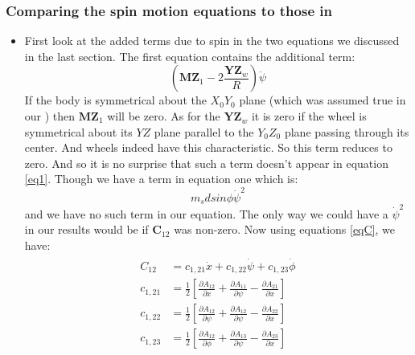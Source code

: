 \documentclass[a4paper,10pt]{article}
\begin{document}
\subsubsection{Comparing the spin motion equations to those in \cite{kim2005dynamic}}
\begin{itemize}

\item First look at the added terms due to spin in the two equations we discussed in the last section. The first equation 
contains the additional term:
\[
 \left(\mathbf{MZ}_1-2\frac{\mathbf{YZ}_w}{R}\right)\ddot\psi
\]
If the body is symmetrical about the $X_0Y_0$ plane (which was assumed true in our \cite{kim2005dynamic}) then $\mathbf{MZ}_1$
will be zero. As for the $\mathbf{YZ}_w$ it is zero if the wheel is symmetrical about its $YZ$ plane parallel to the $Y_0Z_0$
plane passing through its center. And wheels indeed have this characteristic. So this term reduces to zero. And so it is
no surprise that such a term doesn't appear in equation \ref{eq1}. Though we have a term in equation one which is:
\[
 m_sdsin\phi{\dot{\psi}}^2
\]
and we have no such term in our equation. The only way we could have a ${\dot{\psi}}^2$ in our results would be if $\mathbf{C}_{12}$
was non-zero. Now using equations \ref{eqC}, we have:
\begin{align}
\begin{split}
 C_{12} &= c_{1,21}\dot{x} + c_{1,22}\dot{\psi} + c_{1,23}\dot{\phi} \\
 c_{1,21} &= \frac{1}{2}\left[\frac{\partial A_{12}}{\partial x} + \frac{\partial A_{11}}{\partial \psi} - \frac{\partial A_{21}}{\partial x}\right] \\
 c_{1,22} &= \frac{1}{2}\left[\frac{\partial A_{12}}{\partial \psi} + \frac{\partial A_{12}}{\partial \psi} - \frac{\partial A_{22}}{\partial x}\right] \\
 c_{1,23} &= \frac{1}{2}\left[\frac{\partial A_{12}}{\partial \phi} + \frac{\partial A_{13}}{\partial \psi} - \frac{\partial A_{23}}{\partial x}\right]
\end{split}
\end{align}


\end{itemize}
\end{document}
